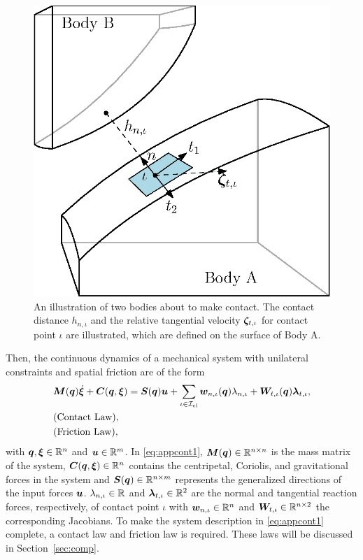 \documentclass[../DC2017114Bouma.tex]{subfiles}
\begin{document}
\begin{figure}[h]
\centering
\includegraphics[width=.5\textwidth]{contactplanes2.eps}\caption{An illustration of two bodies about to make contact. The contact distance $h_{n,\iota}$ and the relative tangential velocity $\boldsymbol{\zeta}_{t,\iota}$ for contact point $\iota$ are illustrated, which are defined on the surface of Body A.} \label{fig:contactplanes}
\end{figure}

Then, the continuous dynamics of a mechanical system with unilateral constraints and spatial friction are of the form
\begin{align}
&{\boldsymbol{M}}({\boldsymbol{q}})\dot{\boldsymbol{\xi}} + {\boldsymbol{C}}({\boldsymbol{q}},\boldsymbol{\xi}) = {\boldsymbol{S}}({\boldsymbol{q}}){\boldsymbol{u}} + \sum_{\iota\in\mathcal{I}_{\text{cl}}}{\boldsymbol{w}}_{n,\iota}({\boldsymbol{q}})\lambda_{n,\iota} + {\boldsymbol{W}}_{t,\iota}({\boldsymbol{q}})\boldsymbol{\lambda}_{t,\iota}, \label{eq:appcont1}\\
&\text{(Contact Law)},\nonumber\\
&\text{(Friction Law)},\nonumber
\end{align}
%
%
%
%
%
%
%
with ${\boldsymbol{q}},\boldsymbol{\xi}\in\mathbb{R}^{n}$ and ${\boldsymbol{u}}\in\mathbb{R}^m$. In \eqref{eq:appcont1}, ${\boldsymbol{M}}({\boldsymbol{q}})\in\mathbb{R}^{n\times n}$ is the mass matrix of the system, ${\boldsymbol{C}}({\boldsymbol{q}},\boldsymbol{\xi})\in\mathbb{R}^{n}$ contains the centripetal, Coriolis, and gravitational forces in the system and ${\boldsymbol{S}}({\boldsymbol{q}})\in\mathbb{R}^{n\times m}$ represents the generalized directions of the input forces ${\boldsymbol{u}}$. $\lambda_{n,\iota}\in\mathbb{R}$ and $\boldsymbol{\lambda}_{t,\iota}\in\mathbb{R}^{2}$ are the normal and tangential reaction forces, respectively, of contact point $\iota$ with ${\boldsymbol{w}}_{n,\iota}\in\mathbb{R}^{n}$ and ${\boldsymbol{W}}_{t,\iota}\in\mathbb{R}^{n\times 2}$ the corresponding Jacobians. To make the system description in \eqref{eq:appcont1} complete, a contact law and friction law is required. These laws will be discussed in Section~\ref{sec:comp}.
\end{document}
